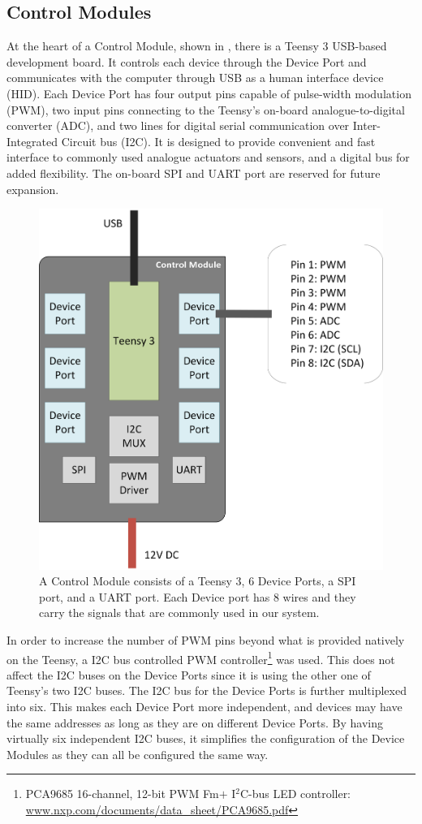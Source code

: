 \subsection{Control Modules}\label{subsec:controller}

At the heart of a Control Module, shown in , there is a Teensy 3 USB-based development board. It controls each device through the Device Port and communicates with the computer through USB as a human interface device (HID). Each Device Port has four output pins capable of pulse-width modulation (PWM), two input pins connecting to the Teensy's on-board analogue-to-digital converter (ADC), and two lines for digital serial communication over Inter-Integrated Circuit bus (I2C). It is designed to provide convenient and fast interface to commonly used analogue actuators and sensors, and a digital bus for added flexibility. The on-board SPI and UART port are reserved for future expansion.

\begin{figure}[!htbp]
	\centering
	\includegraphics[width=0.68 \textwidth]{"fig/interactive control system/Control_Module"}
	\caption[Block diagram of the Control Module]{A Control Module consists of a Teensy 3, 6 Device Ports, a SPI port, and a UART port. Each Device port has 8 wires and they carry the signals that are commonly used in our system.}
	\label{fig:Control_Module}
\end{figure}

In order to increase the number of PWM pins beyond what is provided natively on the Teensy, a I2C bus controlled PWM controller\footnote{PCA9685 16-channel, 12-bit PWM Fm$+$ I$^2$C-bus LED controller: \url{www.nxp.com/documents/data_sheet/PCA9685.pdf}} was used. This does not affect the I2C buses on the Device Ports since it is using the other one of Teensy's two I2C buses. The I2C bus for the Device Ports is further multiplexed into six. This makes each Device Port more independent, and devices may have the same addresses as long as they are on different Device Ports. By having virtually six independent I2C buses, it simplifies the configuration of the Device Modules as they can all be configured the same way.

